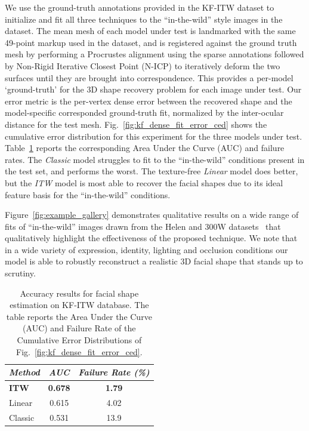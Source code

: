 We use the ground-truth annotations provided in the KF-ITW dataset to initialize and fit all three techniques to the ``in-the-wild'' style images in the dataset. The mean mesh of each model under test is landmarked with the same 49-point markup used in the dataset, and is registered against the ground truth mesh by performing a Procrustes alignment using the sparse annotations followed by Non-Rigid Iterative Closest Point (N-ICP) to iteratively deform the two surfaces until they are brought into correspondence.
This provides a per-model `ground-truth' for the 3D shape recovery problem for each image under test.
Our error metric is the per-vertex dense error between the recovered shape and the model-specific corresponded ground-truth fit, normalized by the inter-ocular distance for the test mesh.
Fig.~\ref{fig:kf_dense_fit_error_ced} shows the cumulative error distribution for this experiment for the three models under test. Table~\ref{tab:kf_dense_fit_error_ced} reports the corresponding Area Under the Curve (AUC) and failure rates. The \emph{Classic} model
struggles to fit to the ``in-the-wild'' conditions present in the test set, and performs the worst.
The texture-free \textit{Linear} model does better, but the \textit{ITW} model is most able to recover the facial shapes due to its ideal feature basis for the ``in-the-wild'' conditions.

Figure~\ref{fig:example_gallery} demonstrates qualitative results on a wide range of fits of ``in-the-wild'' images drawn from the Helen and 300W datasets~\cite{sagonas2016faces,sagonas2013300} that qualitatively highlight the effectiveness of the proposed technique.
We note that in a wide variety of expression, identity, lighting and occlusion conditions our model is able to robustly reconstruct a realistic 3D facial shape that stands up to scrutiny.

\begin{table}[!t]
\centering
\begin{tabular}{|l|cc|}
\hline
\emph{Method} & \emph{AUC} & \emph{Failure Rate (\%)} \\
\hline\hline
\textbf{ITW}     & \textbf{0.678} & \textbf{1.79} \\
Linear  & 0.615 & 4.02 \\
Classic & 0.531 & 13.9 \\
\hline
\end{tabular}
\caption{Accuracy results for facial shape estimation on KF-ITW database. The 
    table reports the Area Under the Curve (AUC) and Failure Rate of the Cumulative Error Distributions of Fig.~\ref{fig:kf_dense_fit_error_ced}.}
\label{tab:kf_dense_fit_error_ced}
\end{table}


